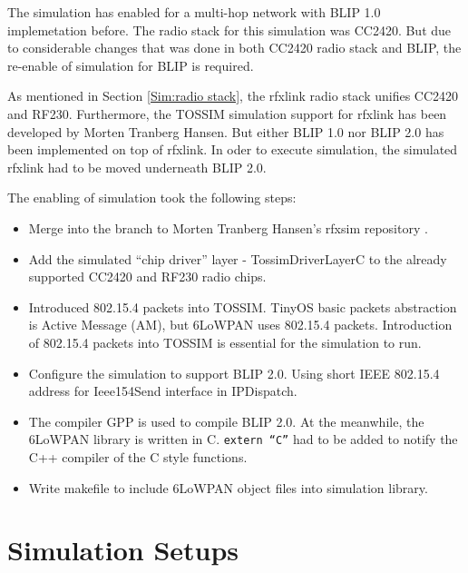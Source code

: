 The simulation has enabled for a multi-hop network with BLIP 1.0 implemetation before. The radio stack for this simulation was CC2420. But due to considerable changes that was done in both CC2420 radio stack and BLIP, the re-enable of simulation for BLIP is required. 
\newline

As mentioned in Section \ref{Sim:radio stack}, the rfxlink radio stack unifies CC2420 and RF230. Furthermore, the TOSSIM simulation support for rfxlink has been developed by Morten Tranberg Hansen. But either BLIP 1.0 nor BLIP 2.0 has been implemented on top of rfxlink. In oder to execute simulation, the simulated rfxlink had to be moved underneath BLIP 2.0. 
\newline

The enabling of simulation took the following steps: 
\begin{itemize}
\item Merge into the branch to Morten Tranberg Hansen's rfxsim repository \cite{rfxsim}. 
\newline

\item Add the simulated ``chip driver'' layer - TossimDriverLayerC to the already supported CC2420 and RF230 radio chips. 
\newline

\item Introduced 802.15.4 packets into TOSSIM. TinyOS basic packets abstraction is Active Message (AM), but 6LoWPAN uses 802.15.4 packets. Introduction of 802.15.4 packets into TOSSIM is essential for the simulation to run.
\newline

\item Configure the simulation to support BLIP 2.0. Using short IEEE 802.15.4 address for Ieee154Send interface in IPDispatch. 
\newline

\item The compiler GPP is used to compile BLIP 2.0. At the meanwhile, the 6LoWPAN library is written in C. \texttt{extern ``C''} had to be added to notify the C++ compiler of the C style functions.
\newline

\item Write makefile to include 6LoWPAN object files into simulation library.
\end{itemize}

\section{Simulation Setups}
\label{Sim:Setup}
